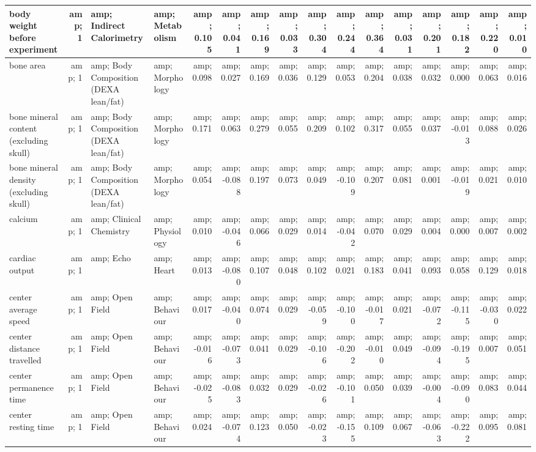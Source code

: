 \documentclass[]{article}
\begin{document}
\begin{table}
\begin{tabular}[t]{l|r|l|l|r|r|r|r|r|r|r|r|r|r|r|r}
\hline
body weight before experiment &amp; 1 &amp; Indirect Calorimetry &amp; Metabolism &amp; 0.105 &amp; 0.041 &amp; 0.169 &amp; 0.033 &amp; 0.304 &amp; 0.244 &amp; 0.364 &amp; 0.031 &amp; 0.201 &amp; 0.182 &amp; 0.220 &amp; 0.010\\
\hline
bone area &amp; 1 &amp; Body Composition (DEXA lean/fat) &amp; Morphology &amp; 0.098 &amp; 0.027 &amp; 0.169 &amp; 0.036 &amp; 0.129 &amp; 0.053 &amp; 0.204 &amp; 0.038 &amp; 0.032 &amp; 0.000 &amp; 0.063 &amp; 0.016\\
\hline
bone mineral content (excluding skull) &amp; 1 &amp; Body Composition (DEXA lean/fat) &amp; Morphology &amp; 0.171 &amp; 0.063 &amp; 0.279 &amp; 0.055 &amp; 0.209 &amp; 0.102 &amp; 0.317 &amp; 0.055 &amp; 0.037 &amp; -0.013 &amp; 0.088 &amp; 0.026\\
\hline
bone mineral density (excluding skull) &amp; 1 &amp; Body Composition (DEXA lean/fat) &amp; Morphology &amp; 0.054 &amp; -0.088 &amp; 0.197 &amp; 0.073 &amp; 0.049 &amp; -0.109 &amp; 0.207 &amp; 0.081 &amp; 0.001 &amp; -0.019 &amp; 0.021 &amp; 0.010\\
\hline
calcium &amp; 1 &amp; Clinical Chemistry &amp; Physiology &amp; 0.010 &amp; -0.046 &amp; 0.066 &amp; 0.029 &amp; 0.014 &amp; -0.042 &amp; 0.070 &amp; 0.029 &amp; 0.004 &amp; 0.000 &amp; 0.007 &amp; 0.002\\
\hline
cardiac output &amp; 1 &amp; Echo &amp; Heart &amp; 0.013 &amp; -0.080 &amp; 0.107 &amp; 0.048 &amp; 0.102 &amp; 0.021 &amp; 0.183 &amp; 0.041 &amp; 0.093 &amp; 0.058 &amp; 0.129 &amp; 0.018\\
\hline
center average speed &amp; 1 &amp; Open Field &amp; Behaviour &amp; 0.017 &amp; -0.040 &amp; 0.074 &amp; 0.029 &amp; -0.059 &amp; -0.100 &amp; -0.017 &amp; 0.021 &amp; -0.072 &amp; -0.115 &amp; -0.030 &amp; 0.022\\
\hline
center distance travelled &amp; 1 &amp; Open Field &amp; Behaviour &amp; -0.016 &amp; -0.073 &amp; 0.041 &amp; 0.029 &amp; -0.106 &amp; -0.202 &amp; -0.010 &amp; 0.049 &amp; -0.094 &amp; -0.195 &amp; 0.007 &amp; 0.051\\
\hline
center permanence time &amp; 1 &amp; Open Field &amp; Behaviour &amp; -0.025 &amp; -0.083 &amp; 0.032 &amp; 0.029 &amp; -0.026 &amp; -0.101 &amp; 0.050 &amp; 0.039 &amp; -0.004 &amp; -0.090 &amp; 0.083 &amp; 0.044\\
\hline
center resting time &amp; 1 &amp; Open Field &amp; Behaviour &amp; 0.024 &amp; -0.074 &amp; 0.123 &amp; 0.050 &amp; -0.023 &amp; -0.155 &amp; 0.109 &amp; 0.067 &amp; -0.063 &amp; -0.222 &amp; 0.095 &amp; 0.081\\

\end{tabular}
\end{table}
\end{document}
